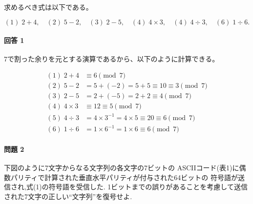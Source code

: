 \documentclass[dvipdfmx,titlepage,a4j]{jsarticle}
\begin{document}
求めるべき式は以下である。

\[
(1)\;2 + 4, \quad 
(2)\;5 - 2, \quad 
(3)\;2 - 5, \quad 
(4)\;4 \times 3, \quad 
(4)\;4 \div 3, \quad 
(6)\;1 \div 6.
\]

\paragraph{ 回答 1\\}
7で割った余りを元とする演算であるから、以下のように計算できる。

\[
\begin{aligned}
(1)\;2 + 4 &\equiv 6 \pmod{7}\\[6pt]
(2)\;5 - 2 &= 5 + (-2) = 5 + 5 \equiv 10 \equiv 3 \pmod{7}\\[6pt]
(3)\;2 - 5 &= 2 + (-5) = 2 + 2 \equiv 4 \pmod{7}\\[6pt]
(4)\;4 \times 3 &\equiv 12 \equiv 5 \pmod{7}\\[6pt]
(5)\;4 \div 3 &= 4 \times 3^{-1} = 4 \times 5 \equiv 20 \equiv 6 \pmod{7}\\[6pt]
(6)\;1 \div 6 &= 1 \times 6^{-1} = 1 \times 6 \equiv 6 \pmod{7}
\end{aligned}
\]


\paragraph{ 問題 2\\}
下図のように7文字からなる文字列の各文字の7ビットの
ASCIIコード(表1)に偶数パリティで計算された垂直水平パリティが付与された64ビットの
符号語が送信され,式(1)の符号語を受信した.
1ビットまでの誤りがあることを考慮して送信された7文字の正しい“文字列”を復号せよ.
\end{document}
